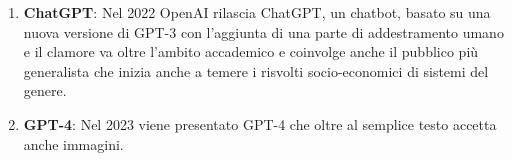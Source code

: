 \begin{enumerate}
    \item \textbf{ChatGPT}: Nel 2022 OpenAI rilascia ChatGPT, un chatbot, basato su una nuova versione di GPT-3 con l'aggiunta di una parte di addestramento umano e il clamore va oltre l'ambito accademico e coinvolge anche il pubblico più generalista che inizia anche a temere i risvolti socio-economici di sistemi del genere.
    \item \textbf{GPT-4}: Nel 2023 viene presentato GPT-4 che oltre al semplice testo accetta anche immagini. 
\end{enumerate}